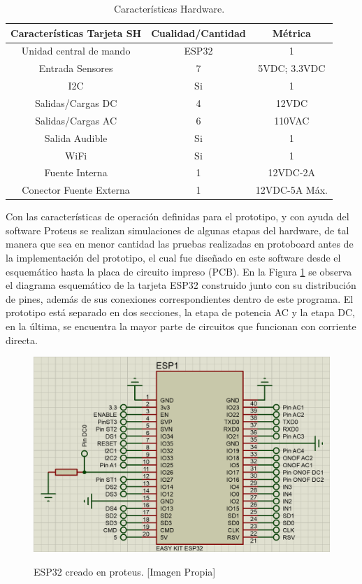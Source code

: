 \begin{table}[H]
	\begin{center}
		\caption{Características Hardware.}
		\label{table:carac}
		\begin{tabular}{|c|c|c|}
			\hline 
			\textbf{Características Tarjeta SH} & \textbf{Cualidad/Cantidad} & \textbf{Métrica} \\ 
			\hline 
			Unidad central de mando & ESP32 & 1\\ 
			\hline 
			Entrada Sensores & 7 & 5VDC; 3.3VDC\\
			\hline 
			I2C & Si & 1\\
			\hline 
			Salidas/Cargas DC & 4 & 12VDC\\
			\hline 
			Salidas/Cargas AC & 6 & 110VAC\\
			\hline 
			Salida Audible & Si & 1\\
			\hline 
			WiFi & Si & 1\\ 
			\hline 
			Fuente Interna & 1 & 12VDC-2A\\
			\hline
			Conector Fuente Externa & 1 & 12VDC-5A Máx.\\
			\hline
		\end{tabular} 
	\end{center}
\end{table}

Con las características de operación definidas para el prototipo, y con ayuda del software Proteus se realizan simulaciones de algunas etapas del hardware, de tal manera que sea en menor cantidad las pruebas realizadas en protoboard antes de la implementación del prototipo, el cual fue diseñado en este software desde el esquemático hasta la placa de circuito impreso (PCB). En la Figura \ref{fig:esp32} se observa el diagrama esquemático de la tarjeta ESP32 construido junto con su distribución de pines, además de sus conexiones correspondientes dentro de este programa. El prototipo está separado en dos secciones, la etapa de potencia AC y la etapa DC, en la última, se encuentra la mayor parte de circuitos que funcionan con corriente directa.\\

\begin{figure}[H]
	\centering
	\caption[ESP32 creado en proteus.]{ESP32 creado en proteus. [Imagen Propia]}
	\includegraphics[width=0.5\linewidth]{Imagenes/ESP32}	
	\label{fig:esp32}
\end{figure}

